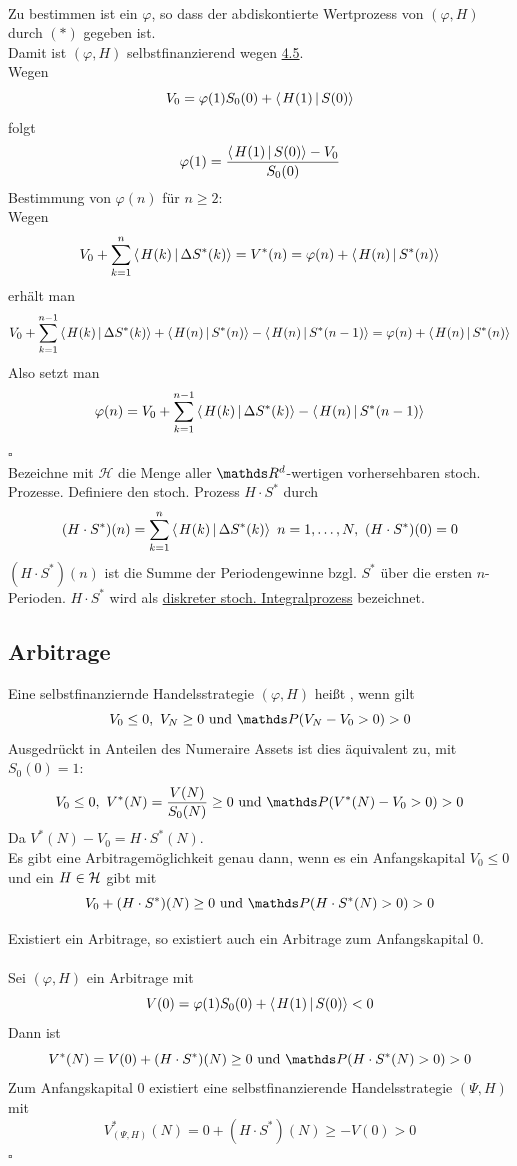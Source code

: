 \\
Zu bestimmen ist ein $\varphi$, so dass der abdiskontierte Wertprozess von $(\varphi,H)$ durch $(\ast)$ gegeben ist.\\
Damit ist $(\varphi,H)$ selbstfinanzierend wegen \hyperref[sub:charkt_selbstfinanzierung]{4.5}.\\
Wegen
\[
V_0=\varphi(1)S_0(0)+\sprod{H(1)}{S(0)}
\]
folgt
\[
\varphi(1)=\frac{\sprod{H(1)}{S(0)}-V_0}{S_0(0)}
\]
Bestimmung von $\varphi(n)$ für $n\ge 2$:\\
Wegen
\[
V_0+\sum_{k=1}^{n}\sprod{H(k)}{\Delta S^*(k)}=V^*(n)=\varphi(n)+\sprod{H(n)}{S^*(n)}
\]
erhält man
\[
V_0+\sum_{k=1}^{n-1}\sprod{H(k)}{\Delta S^*(k)}+\sprod{H(n)}{S^*(n)}-\sprod{H(n)}{S^*(n-1)}=\varphi(n)+\sprod{H(n)}{S^*(n)}
\]
Also setzt man
\[
\varphi(n)=V_0+\sum_{k=1}^{n-1}\sprod{H(k)}{\Delta S^*(k)}-\sprod{H(n)}{S^*(n-1)}
\]
\hfill $\square$\\
Bezeichne mit $\mathcal{H}$ die Menge aller $\R^d$-wertigen vorhersehbaren stoch. Prozesse.
Definiere den stoch. Prozess $H\cdot S^*$ durch
\[
(H\cdot S^*)(n)=\sum_{k=1}^{n}\sprod{H(k)}{\Delta S^*(k)}~ n=1,\dots,N,~ (H\cdot S^*)(0)=0
\]
$(H\cdot S^*)(n)$ ist die Summe der Periodengewinne bzgl. $S^*$ über die ersten $n$-Perioden.
$H\cdot S^*$ wird als \uline{diskreter stoch. Integralprozess} bezeichnet.


\subsection{Arbitrage}
\label{sub:arbitrage_math}
Eine selbstfinanziernde Handelsstrategie $(\varphi,H)$ heißt , wenn gilt 
\[
V_0\le 0,~V_N\ge 0 \text{ und } \Pw(V_N-V_0>0)>0
\]
Ausgedrückt in Anteilen des Numeraire Assets ist dies äquivalent zu, mit $S_0(0)=1$:
\[
V_0\le 0,~ V^*(N)=\frac{V(N)}{S_0(N)}\ge 0 \text{ und } \Pw(V^*(N)-V_0 > 0) > 0
\]
Da $V^*(N)-V_0=H\cdot S^*(N)$.\\
Es gibt eine Arbitragemöglichkeit genau dann, wenn es ein Anfangskapital $V_0\le 0$ und ein $H\in \mathcal{H}$ gibt mit
\[
V_0+(H\cdot S^*)(N)\ge 0 \text{ und } \Pw(H\cdot S^*(N)>0)>0
\]

Existiert ein Arbitrage, so existiert auch ein Arbitrage zum Anfangskapital 0.\\

\\
Sei $(\varphi,H)$ ein Arbitrage mit
\[
V(0)=\varphi(1)S_0(0)+\sprod{H(1)}{S(0)}<0
\]
Dann ist
\[
V^*(N)=V(0)+(H\cdot S^*)(N)\ge 0 \text{ und } \Pw(H\cdot S^*(N)>0)>0
\]
Zum Anfangskapital 0 existiert eine selbstfinanzierende Handelsstrategie $(\Psi,H)$ mit 
\[
V_{(\Psi,H)}^*(N)= 0+ (H\cdot S^*)(N)\ge -V(0)>0
\]
\hfill $\square$

